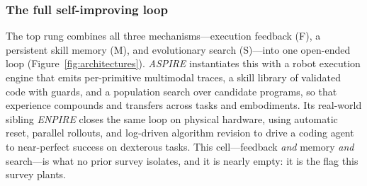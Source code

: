 \subsubsection{The full self-improving loop}
\label{ssec:fullloop}
The top rung combines all three mechanisms---execution feedback (F), a persistent skill
memory (M), and evolutionary search (S)---into one open-ended loop
(Figure~\ref{fig:architectures}). \emph{ASPIRE} \citep{aspire} instantiates this with a
robot execution engine that emits per-primitive multimodal traces, a skill library of
validated code with guards, and a population search over candidate programs, so that
experience compounds and transfers across tasks and embodiments. Its real-world sibling
\emph{ENPIRE} \citep{enpire} closes the same loop on physical hardware, using automatic
reset, parallel rollouts, and log-driven algorithm revision to drive a coding agent to
near-perfect success on dexterous tasks. This cell---feedback \emph{and} memory \emph{and}
search---is what no prior survey isolates, and it is nearly empty: it is the flag this
survey plants.
